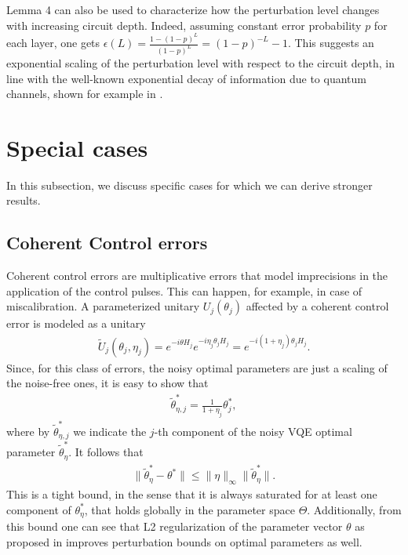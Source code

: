 \documentclass[letterpaper, 10 pt]{IEEEtran}  %
\begin{document}
Lemma 4 can also be used to characterize how the perturbation level changes with increasing circuit depth. Indeed, 
assuming constant error probability $p$ for each layer, one gets $\epsilon(L)=\frac{1-(1-p)^L}{(1-p)^L}=(1-p)^{-L}-1$.
This suggests an exponential scaling of the perturbation level with respect to the circuit depth, in line with the well-known exponential decay of information due to quantum channels, shown for example in \cite{Nielsen2012}. 



\section{Special cases}
In this subsection, we discuss specific cases for which we can derive stronger results. 

\subsection{Coherent Control errors}
Coherent control errors are multiplicative errors that model imprecisions in the application of the control pulses. 
This can happen, for example, in case of miscalibration. 
A parameterized unitary $U_j(\theta_j)$ affected by a coherent control error is modeled as a unitary 
\begin{align}
   \tilde{U}_j(\theta_j, \eta_j)=e^{-i\theta H_j}e^{-i\eta_j\theta_j H_j}=e^{-i(1+\eta_j)\theta_j H_j}.
\end{align}
Since, for this class of errors, the noisy optimal parameters are just a scaling of the noise-free ones, it is easy to show that 
\begin{align}
   \tilde{\theta}^*_{\eta,j}=\frac{1}{1+\eta_j}\theta^*_j, 
\end{align}
where by $\tilde{\theta}^*_{\eta,j}$ we indicate the $j$-th component of the noisy VQE optimal parameter $\tilde{\theta}^*_{\eta}$. 
It follows that  
\begin{align}
   \|\tilde{\theta}^*_\eta - \theta^* \| \le \|\eta\|_\infty \|\tilde{\theta}^*_\eta\|. 
\end{align}
This is a tight bound, in the sense that it is always saturated for at least one component of $\theta^*_\eta$, that holds globally in the parameter space $\Theta$.
Additionally, from this bound one can see that L2 regularization of the parameter vector $\theta$ as proposed in \cite{Berberich2024b} improves perturbation bounds on optimal parameters as well. 
\\
\end{document}
